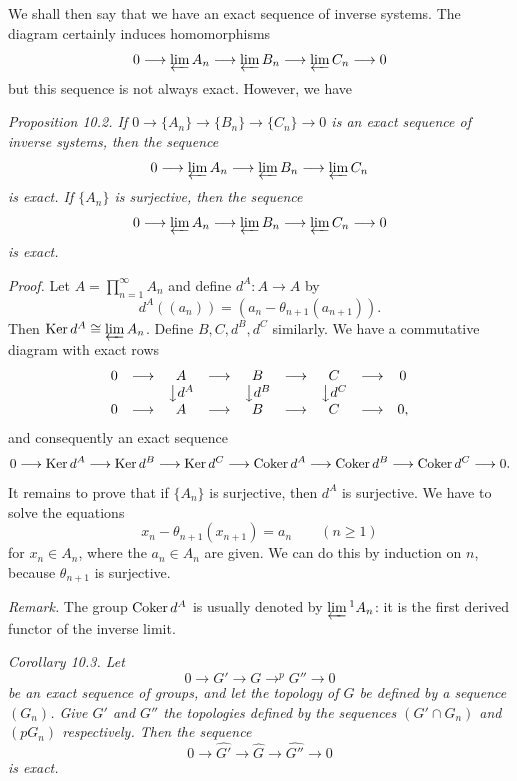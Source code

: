 
We shall then say that we have an exact sequence of inverse systems. The diagram certainly induces homomorphisms
\[
 0\longrightarrow\varprojlim A_n\longrightarrow\varprojlim B_n\longrightarrow\varprojlim C_n\longrightarrow0
\]
but this sequence is not always exact. However, we have

\noindent\textit{Proposition 10.2. If $0\longrightarrow\{A_n\}\longrightarrow\{B_n\}\longrightarrow\{C_n\}\longrightarrow0$ is an exact sequence of inverse systems, then the sequence}
\[
 0\longrightarrow\varprojlim A_n\longrightarrow\varprojlim B_n\longrightarrow\varprojlim C_n
\]
\textit{is exact. If $\{A_n\}$ is surjective, then the sequence}
\[
 0\longrightarrow\varprojlim A_n\longrightarrow\varprojlim B_n\longrightarrow\varprojlim C_n\longrightarrow0
\]
\textit{is exact.}

\noindent\textit{Proof.} Let $A=\prod_{n=1}^{\infty}A_n$ and define $d^A:A\longrightarrow A$ by
\[
 d^A((a_n))=(a_n-\theta_{n+1}(a_{n+1})).
\]
Then $\mathop{\rm Ker}d^A\cong\varprojlim A_n$. Define $B,C,d^B,d^C$ similarly. We have a commutative diagram with exact rows
\[
\begin{array}{ccccccccc}
0&\longrightarrow&A&\longrightarrow&B&\longrightarrow&C&\longrightarrow&0\\
&&\big\downarrow d^A&&\big\downarrow d^B&&\big\downarrow d^C&&\\
0&\longrightarrow&A&\longrightarrow&B&\longrightarrow&C&\longrightarrow&0,
\end{array}
\]
and consequently an exact sequence
\[
0\longrightarrow\mathop{\rm Ker}d^A\longrightarrow\mathop{\rm Ker}d^B\longrightarrow\mathop{\rm Ker}d^C
\longrightarrow\mathop{\rm Coker}d^A\longrightarrow\mathop{\rm Coker}d^B\longrightarrow\mathop{\rm Coker}d^C\longrightarrow0.
\]
It remains to prove that if $\{A_n\}$ is surjective, then $d^A$ is surjective. We have to solve the equations
\[
 x_n-\theta_{n+1}(x_{n+1})=a_n\qquad(n\geq1)
\]
for $x_n\in A_n$, where the $a_n\in A_n$ are given. We can do this by induction on $n$, because $\theta_{n+1}$ is surjective. \proofbox

\noindent\textit{Remark.} The group $\mathop{\rm Coker}d^A$ is usually denoted by $\varprojlim{}^1 A_n$: it is the first derived functor of the inverse limit.

\noindent\textit{Corollary 10.3. Let}
\[
0\longrightarrow G'\longrightarrow G\mathop{\longrightarrow}^{p}G''\longrightarrow0
\]
\textit{be an exact sequence of groups, and let the topology of $G$ be defined by a sequence $(G_n)$. Give $G'$ and $G''$ the topologies defined by the sequences $(G'\cap G_n)$ and $(pG_n)$ respectively. Then the sequence}
\[
0\longrightarrow\widehat{G'}\longrightarrow\widehat G\longrightarrow\widehat{G''}\longrightarrow0
\]
\textit{is exact.}

